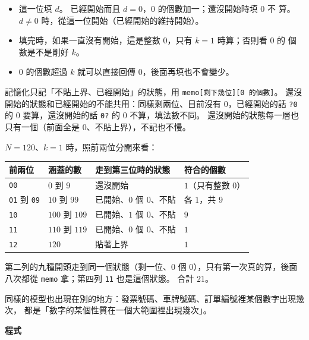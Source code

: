 \begin{itemize}
\item 這一位填 $d$。 已經開始而且 $d = 0$，$0$ 的個數加一；還沒開始時填 $0$ 不
算。 $d \ne 0$ 時，從這一位開始（已經開始的維持開始）。
\item 填完時，如果一直沒有開始，這是整數 $0$，只有 $k = 1$ 時算；否則看 $0$ 的
個數是不是剛好 $k$。
\item $0$ 的個數超過 $k$ 就可以直接回傳 $0$，後面再填也不會變少。
\end{itemize}

記憶化只記「不貼上界、已經開始」的狀態，用 \texttt{memo[剩下幾位][0 的個數]}。
還沒開始的狀態和已經開始的不能共用：同樣剩兩位、目前沒有 $0$，已經開始的話
\texttt{?0} 的 $0$ 要算，還沒開始的話 \texttt{0?} 的 $0$ 不算，填法數不同。
還沒開始的狀態每一層也只有一個（前面全是 $0$、不貼上界），不記也不慢。

$N = 120$、$k = 1$ 時，照前兩位分開來看：

\begin{center}
\begin{tabular}{llll}
\toprule
前兩位 & 涵蓋的數 & 走到第三位時的狀態 & 符合的個數 \\
\midrule
\texttt{00} & $0$ 到 $9$ & 還沒開始 & $1$（只有整數 $0$） \\
\texttt{01} 到 \texttt{09} & $10$ 到 $99$ & 已開始、$0$ 個 $0$、不貼 & 各 $1$，共 $9$ \\
\texttt{10} & $100$ 到 $109$ & 已開始、$1$ 個 $0$、不貼 & $9$ \\
\texttt{11} & $110$ 到 $119$ & 已開始、$0$ 個 $0$、不貼 & $1$ \\
\texttt{12} & $120$ & 貼著上界 & $1$ \\
\bottomrule
\end{tabular}
\end{center}

第二列的九種開頭走到同一個狀態（剩一位、$0$ 個 $0$），只有第一次真的算，後面
八次都從 \texttt{memo} 拿；第四列 \texttt{11} 也是這個狀態。 合計 $21$。

同樣的模型也出現在別的地方：發票號碼、車牌號碼、訂單編號裡某個數字出現幾次，
都是「數字的某個性質在一個大範圍裡出現幾次」。

\textbf{程式}

